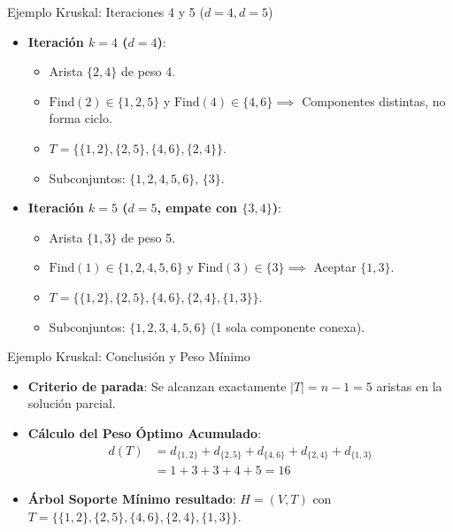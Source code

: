 \documentclass[
  ignorenonframetext,
]{beamer}
\providecommand{\tightlist}{%
  \setlength{\itemsep}{0pt}\setlength{\parskip}{0pt}}
\begin{document}
\begin{frame}{Ejemplo Kruskal: Iteraciones 4 y 5 (\(d=4, d=5\))}
\label{ejemplo-kruskal-iteraciones-4-y-5-d4-d5}
\begin{itemize}
\tightlist
\item
  \textbf{Iteración \(k=4\) (\(d=4\))}:

  \begin{itemize}
  \tightlist
  \item
    Arista \(\{2, 4\}\) de peso 4.
  \item
    \(\text{Find}(2) \in \{1, 2, 5\}\) y
    \(\text{Find}(4) \in \{4, 6\} \implies\) Componentes distintas, no
    forma ciclo.
  \item
    \(T = \{\{1, 2\}, \{2, 5\}, \{4, 6\}, \{2, 4\}\}\).
  \item
    Subconjuntos: \(\{1, 2, 4, 5, 6\}, \, \{3\}\).
  \end{itemize}
\item
  \textbf{Iteración \(k=5\) (\(d=5\), empate con \(\{3,4\}\))}:

  \begin{itemize}
  \tightlist
  \item
    Arista \(\{1, 3\}\) de peso 5.
  \item
    \(\text{Find}(1) \in \{1, 2, 4, 5, 6\}\) y
    \(\text{Find}(3) \in \{3\} \implies\) Aceptar \(\{1, 3\}\).
  \item
    \(T = \{\{1, 2\}, \{2, 5\}, \{4, 6\}, \{2, 4\}, \{1, 3\}\}\).
  \item
    Subconjuntos: \(\{1, 2, 3, 4, 5, 6\}\) (1 sola componente conexa).
  \end{itemize}
\end{itemize}
\end{frame}

\begin{frame}{Ejemplo Kruskal: Conclusión y Peso Mínimo}
\label{ejemplo-kruskal-conclusiuxf3n-y-peso-muxednimo}
\begin{itemize}
\item
  \textbf{Criterio de parada}: Se alcanzan exactamente
  \(|T| = n - 1 = 5\) aristas en la solución parcial.
\item
  \textbf{Cálculo del Peso Óptimo Acumulado}: \[
  \begin{aligned}
  d(T) &= d_{\{1,2\}} + d_{\{2,5\}} + d_{\{4,6\}} + d_{\{2,4\}} + d_{\{1,3\}} \\
       &= 1 + 3 + 3 + 4 + 5 = 16
  \end{aligned}
  \]
\item
  \textbf{Árbol Soporte Mínimo resultado}: \(H = (V, T)\) con
  \(T = \{\{1, 2\}, \{2, 5\}, \{4, 6\}, \{2, 4\}, \{1, 3\}\}\).
\end{itemize}
\end{frame}
\end{document}
